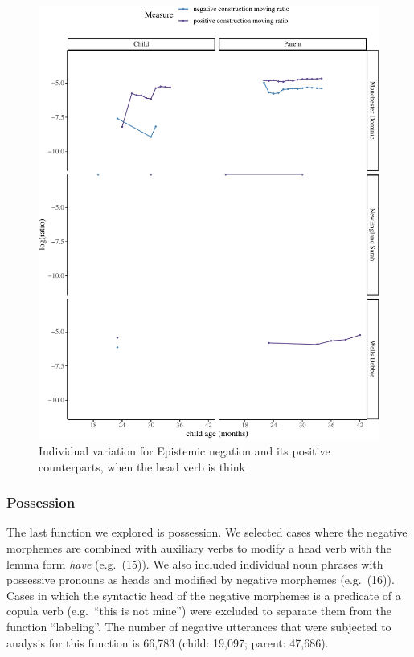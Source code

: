 \documentclass[
  english,
  man,floatsintext]{apa6}
\begin{document}
\begin{figure}[H]

{\centering \includegraphics{neg_construction_article_files/figure-latex/individualepistemicthink-1} 

}

\caption{Individual variation for Epistemic negation and its positive counterparts, when the head verb is think}\label{fig:individualepistemicthink}
\end{figure}

\clearpage

\hypertarget{possession}{%
\subsubsection{Possession}\label{possession}}

The last function we explored is possession. We selected cases where the negative morphemes are combined with auxiliary verbs to modify a head verb with the lemma form \emph{have} (e.g.~(15)). We also included individual noun phrases with possessive pronouns as heads and modified by negative morphemes (e.g.~(16)). Cases in which the syntactic head of the negative morphemes is a predicate of a copula verb (e.g.~\enquote{this is not mine}) were excluded to separate them from the function \enquote{labeling}. The number of negative utterances that were subjected to analysis for this function is 66,783 (child: 19,097; parent: 47,686).
\end{document}

